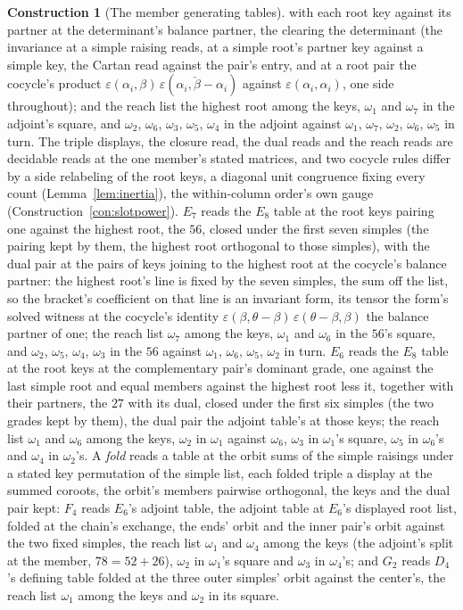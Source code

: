 \documentclass[11pt]{article}
\theoremstyle{definition}
\newtheorem{construction}{Construction}
\begin{document}
\begin{construction}[The member generating tables]
with each root key against its partner at the determinant's
balance partner, the clearing the determinant (the invariance at a
simple raising reads, at a simple root's partner key against a
simple key, the Cartan read against the pair's entry, and at a
root pair the cocycle's product $\varepsilon(\alpha_i,\beta)\,
\varepsilon(\alpha_i,\check\beta-\alpha_i)$ against
$\varepsilon(\alpha_i,\alpha_i)$, one side throughout); and the
reach list the highest root among the keys, $\omega_1$ and
$\omega_7$ in the adjoint's square, and $\omega_2$, $\omega_6$,
$\omega_3$, $\omega_5$, $\omega_4$ in the adjoint against
$\omega_1$, $\omega_7$, $\omega_2$, $\omega_6$, $\omega_5$ in
turn. The triple displays, the closure read, the dual reads and
the reach reads are decidable reads at the one member's stated
matrices, and two cocycle rules differ by a side relabeling of the
root keys, a diagonal unit congruence fixing every count
(Lemma~\ref{lem:inertia}), the within-column order's own gauge
(Construction~\ref{con:slotpower}). $E_7$ reads the $E_8$ table at
the root keys pairing one against the highest root, the $56$,
closed under the first seven simples (the pairing kept by them,
the highest root orthogonal to those simples), with the dual pair
at the pairs of keys joining to the highest root at the cocycle's
balance partner: the highest root's line is fixed by the seven
simples, the sum off the list, so the bracket's coefficient on
that line is an invariant form, its tensor the form's solved witness
at the cocycle's identity
$\varepsilon(\beta,\theta-\beta)\,\varepsilon(\theta-\beta,\beta)$
the balance partner of one; the reach list $\omega_7$ among the
keys, $\omega_1$ and $\omega_6$ in the $56$'s square, and
$\omega_2$, $\omega_5$, $\omega_4$, $\omega_3$ in the $56$ against
$\omega_1$, $\omega_6$, $\omega_5$, $\omega_2$ in turn. $E_6$
reads the $E_8$ table at the root keys at the complementary
pair's dominant grade, one against the last simple root and equal
members against the highest root less it, together with their
partners, the $27$ with its dual, closed under the first six
simples (the two grades kept by them), the dual pair the adjoint
table's at those keys; the reach list $\omega_1$ and $\omega_6$
among the keys, $\omega_2$ in $\omega_1$ against $\omega_6$,
$\omega_3$ in $\omega_1$'s square, $\omega_5$ in $\omega_6$'s and
$\omega_4$ in $\omega_2$'s. A \emph{fold} reads a table at the
orbit sums of the simple raisings under a stated key permutation
of the simple list, each folded triple a display at the summed
coroots, the orbit's members pairwise orthogonal, the keys and the
dual pair kept: $F_4$ reads $E_6$'s adjoint table, the adjoint
table at $E_6$'s displayed root list, folded at the chain's
exchange, the ends' orbit and the inner pair's orbit against the
two fixed simples, the reach list $\omega_1$ and $\omega_4$ among
the keys (the adjoint's split at the member, $78=52+26$),
$\omega_2$ in $\omega_1$'s square and $\omega_3$ in $\omega_4$'s;
and $G_2$ reads $D_4$'s defining table folded at the three outer
simples' orbit against the center's, the reach list $\omega_1$
among the keys and $\omega_2$ in its square.
\end{construction}
\end{document}
